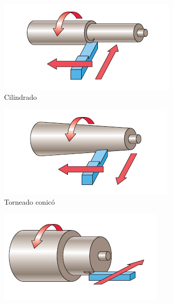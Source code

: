 \begin{figure}[hbt]
    \centering
    \begin{subfigure}{0.3\textwidth}
        \centering
        \includegraphics[width=0.9\linewidth]{Cap1_FormulaciondelProyecto/cilindrado.PNG}
        \caption{Cilindrado}
        \label{fig:Cilintrado}
    \end{subfigure} 
    \begin{subfigure}{0.3\textwidth}
        \centering
        \includegraphics[width=0.9\linewidth]{Cap1_FormulaciondelProyecto/torneadoconico.PNG}
        \caption{Torneado conicó}
        \label{fig:torneadoconico}
    \end{subfigure} 
    \begin{subfigure}{0.3\textwidth}
        \centering
        \includegraphics[width=0.9\linewidth]{Cap1_FormulaciondelProyecto/refrentado.PNG}

\end{subfigure}
\end{figure}
